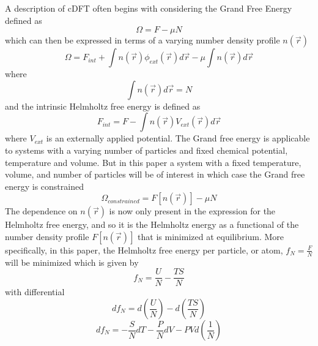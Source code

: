\documentclass[double,12pt]{beavtex}
\begin{document}
A description of cDFT often begins with considering the Grand Free 
Energy defined as
\begin{equation}\Omega=F-\mu{N}\end{equation}
which can then be expressed in terms of a varying number density 
profile $n(\vec r)$
\begin{equation}\label{GrandFE}\Omega= F_{int} +\int n(\vec{r})\phi_{ext}{(\vec r)}d\vec{r}-\mu\int n(\vec r)d\vec{r}\end{equation}
where
\begin{equation}\int n(\vec r)d\vec{r}=N\end{equation}%
and the intrinsic Helmholtz free energy is defined as
\begin{equation}F_{int} = F - \int n(\vec{r})V_{ext}{(\vec r)}d\vec{r}\end{equation}  
where $V_{ext}$ is an externally applied potential. 
The Grand free energy is applicable to systems with a varying number of 
particles and fixed chemical potential, temperature and volume. But in 
this paper a system with a fixed temperature, volume, and number of 
particles will be of interest in which case
the Grand free energy is constrained
\begin{equation}\label{GrandFE}\Omega_{constrained}= F[n(\vec r)]-\mu N\end{equation}
The dependence on $n(\vec r)$ is now only present in the expression for 
the Helmholtz free energy, and so it is the Helmholtz energy as a functional 
of the number density profile $F[n(\vec r)]$ that is minimized at equilibrium. 
More specifically, in this paper, the Helmholtz free energy per particle, 
or atom,  $f_N=\frac{F}{N}$ will be minimized which is given by
\begin{equation}f_N=\frac{U}{N}-\frac{TS}{N}\end{equation}
with differential
\begin{equation}\label{usetoshowmin}df_N=d\left(\frac{U}{N}\right)-d\left(\frac{TS}{N}\right)\end{equation}
\begin{equation}df_N=-\frac{S}{N}dT-\frac{P}{N}dV-PVd\left(\frac{1}{N}\right)\end{equation}
\end{document}
